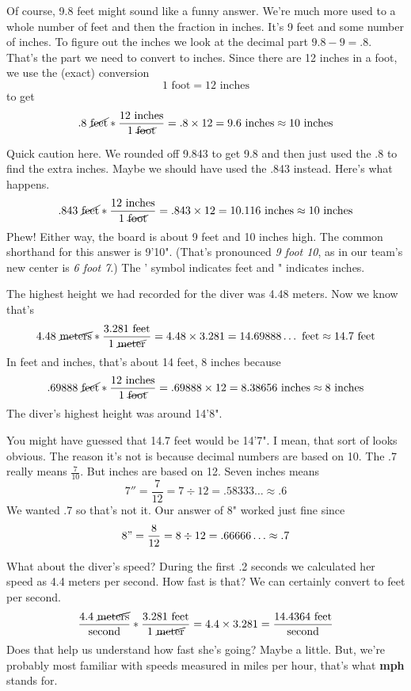 Of course, 9.8 feet might sound like a funny answer.  We're much more used to a whole number of feet and then the fraction in inches.  It's 9 feet and some number of inches.  To figure out the inches we look at the decimal part $9.8-9=.8$.  That's the part we need to convert to inches.    Since there are 12 inches in a foot, we use the (exact) conversion
$$1 \text{ foot} = 12 \text{ inches}$$ to get
$$.8 \text{ \cancel{feet}} \ast \frac{12 \text{ inches}}{1 \text{ \cancel{foot}}} = .8 \times 12 = 9.6 \text{ inches} \approx 10 \text{ inches}$$  

Quick caution here.  We rounded off 9.843 to get 9.8 and then just used the .8 to find the extra inches.  Maybe we should have used the .843 instead.  Here's what happens.
$$.843 \text{ \cancel{feet}} \ast \frac{12 \text{ inches}}{1 \text{ \cancel{foot}}} = .843 \times 12 = 10.116 \text{ inches} \approx 10 \text{ inches}$$  Phew!  Either way, the board is about 9 feet and 10 inches high.  The common shorthand for this answer is 9'10".  (That's pronounced \emph{9 foot 10}, as in our team's new center is \emph{6 foot 7}.)  The ' symbol indicates feet and " indicates inches.

The highest height we had recorded for the diver was 4.48 meters.  Now we know that's 
$$ 4.48 \text{ \cancel{meters}}  \ast \frac{3.281 \text{ feet}}{1 \text{ \cancel{meter}}} 
=4.48 \times 3.281= 14.69888\ldots \text{ feet} \approx 14.7 \text{ feet}$$  
In feet and inches, that's about 14 feet, 8 inches because 
$$.69888 \text{ \cancel{feet}} \ast \frac{12 \text{ inches}}{1 \text{ \cancel{foot}}} = .69888 \times 12 = 8.38656 \text{ inches} \approx 8 \text{ inches}$$ 
The diver's highest height was around 14'8".  

You might have guessed that 14.7 feet would be 14'7".  I mean, that sort of looks obvious.  The reason it's not is because decimal numbers are based on 10.  The .7 really means $\frac{7}{10}$.  But inches are based on 12.  Seven inches means 
$$7''=\frac{7}{12}=7 \div 12 = .58333\ldots \approx .6$$
We wanted .7 so that's not it.  Our answer of 8" worked just fine since 
$$8" = \frac{8}{12} = 8 \div 12 = .66666\ldots \approx .7$$

What about the diver's speed?   During the first .2 seconds we calculated her speed as 4.4 meters per second.  How fast is that?  We can certainly convert to feet per second.  
$$\frac{4.4 \text{ \cancel{meters}}}{\text{second}} \ast \frac{3.281 \text{ feet}}{1 \text{  \cancel{meter}}} = 4.4 \times 3.281 = \frac{14.4364 \text{ feet}}{\text{second}}$$ 
Does that help us understand how fast she's going?  Maybe a little.  But, we're probably most familiar with speeds measured in miles per hour, that's what \textbf{mph} stands for.

